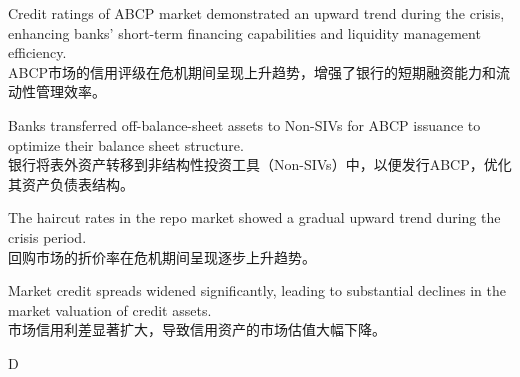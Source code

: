 \documentclass{article}
\begin{document}
                \begin{choices}
                    \item Credit ratings of ABCP market demonstrated an upward trend during the crisis, enhancing banks' short-term financing capabilities and liquidity management efficiency.\\
                    ABCP市场的信用评级在危机期间呈现上升趋势，增强了银行的短期融资能力和流动性管理效率。
                    \item Banks transferred off-balance-sheet assets to Non-SIVs for ABCP issuance to optimize their balance sheet structure.\\
                    银行将表外资产转移到非结构性投资工具（Non-SIVs）中，以便发行ABCP，优化其资产负债表结构。
                    \item The haircut rates in the repo market showed a gradual upward trend during the crisis period.\\
                    回购市场的折价率在危机期间呈现逐步上升趋势。
                    \item Market credit spreads widened significantly, leading to substantial declines in the market valuation of credit assets.\\
                    市场信用利差显著扩大，导致信用资产的市场估值大幅下降。
                \end{choices}
                \begin{correctanswer}
                D
                \end{correctanswer}
                
\end{document}
